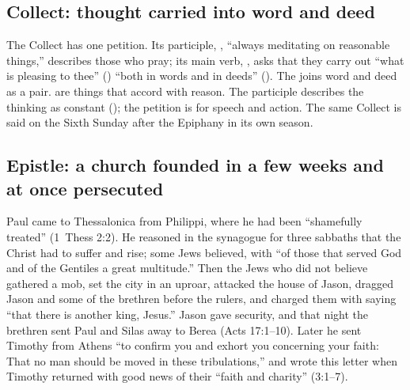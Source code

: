\subsection{Collect: thought carried into word and deed}
\label{sec:element-collect}

The Collect has one petition. Its participle, , ``always meditating on reasonable things,'' describes those who
pray; its main verb, , asks that they carry out ``what is
pleasing to thee'' () ``both in words and in
deeds'' (). The  joins
word and deed as a pair.  are things that accord with
reason. The participle describes the thinking as constant ();
the petition is for speech and action. The same Collect is said on the Sixth Sunday
after the Epiphany in its own season.

\subsection{Epistle: a church founded in a few weeks and at once persecuted}
\label{sec:element-epistle}

Paul came to Thessalonica from Philippi, where
he had been ``shamefully treated'' (1~Thess 2:2). He reasoned in the synagogue
for three sabbaths that the Christ had to suffer and rise; some Jews believed,
with ``of those that served God and of the Gentiles a great multitude.'' Then
the Jews who did not believe gathered a mob, set the city in an uproar,
attacked the house of Jason, dragged Jason and some of the brethren before the
rulers, and charged them with saying ``that there is another king, Jesus.''
Jason gave security, and that night the brethren sent Paul and Silas away to
Berea (Acts 17:1--10). Later he sent Timothy from Athens ``to
confirm you and exhort you concerning your faith: That no man should be moved
in these tribulations,'' and wrote this letter when Timothy returned with good
news of their ``faith and charity'' (3:1--7).

